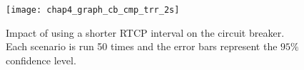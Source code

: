 \begin{figure}
  \centerline{
    {\texttt{[image: chap4\_graph\_cb\_cmp\_trr\_2s]}}
  }
  \caption{Impact of using a shorter RTCP interval on the circuit breaker. 
    Each scenario is run 50 times and the error bars represent the $95\%$ 
    confidence level.}
  \label{fig:short-rtcp}
\end{figure}
